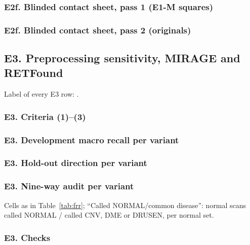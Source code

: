 \subsubsection*{E2f. Blinded contact sheet, pass 1 (E1-M squares)}

{\scriptsize}
\fi
{}\ifgen
\subsubsection*{E2f. Blinded contact sheet, pass 2 (originals)}

{\scriptsize}
\fi

\ifgen
\subsection*{E3. Preprocessing sensitivity, MIRAGE and RETFound}
Label of every E3 row: .
\fi
{}\ifgen
\subsubsection*{E3. Criteria (1)--(3)}
{\scriptsize}
\fi
{}\ifgen
\subsubsection*{E3. Development macro recall per variant}

{\scriptsize\setlength{\tabcolsep}{3pt}}
\fi
{}\ifgen
\subsubsection*{E3. Hold-out direction per variant}

{\scriptsize\setlength{\tabcolsep}{3pt}}
\fi
{}\ifgen
\subsubsection*{E3. Nine-way audit per variant}
Cells as in Table~\ref{tab:frr}; ``Called NORMAL/common disease'': normal scans called NORMAL / called CNV, DME or DRUSEN, per normal set. 
{\scriptsize\setlength{\tabcolsep}{2.5pt}}
\fi
{}\ifgen
\subsubsection*{E3. Checks}

{\scriptsize}
\fi


